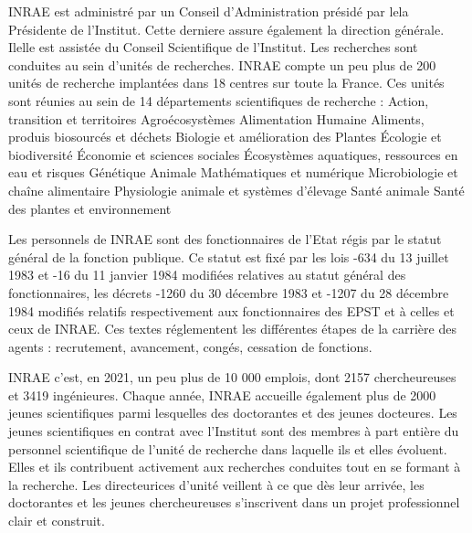 INRAE est administr\'e par un Conseil d'Administration pr\'esid\'e par le\mp la Pr\'esident\mp e de l'Institut. Ce\mp tte dernier\mp e assure \'egalement la direction g\'en\'erale. Il\mp elle est assist\'e\mp e du Conseil Scientifique de l'Institut. Les recherches sont conduites au sein d'unit\'es de recherches. INRAE compte un peu plus de 200 unit\'es de recherche implant\'ees dans 18 centres sur toute la France. Ces unit\'es sont r\'eunies au sein de 14 d\'epartements scientifiques de recherche :
\og Action, transition et territoires \fg{}
\og  Agro\'ecosyst\`emes \fg{}
\og  Alimentation Humaine \fg{}
\og  Aliments, produis biosourc\'es et d\'echets \fg{}
\og  Biologie et am\'elioration des Plantes \fg{}
\og  \'Ecologie et biodiversit\'e \fg{}
\og  \'Economie et sciences sociales \fg{}
\og  \'Ecosyst\`emes aquatiques, ressources en eau et risques \fg{}
\og  G\'en\'etique Animale \fg{}
\og  Math\'ematiques et num\'erique \fg{}
\og  Microbiologie et cha\^ine alimentaire \fg{}
\og  Physiologie animale et syst\`emes d'\'elevage \fg{}
\og  Sant\'e animale \fg{}
\og  Sant\'e des plantes et environnement \fg{}

Les personnels de INRAE sont des fonctionnaires de l'Etat r\'egis par le statut g\'en\'eral de la fonction publique. Ce statut est fix\'e par les lois -634 du 13 juillet 1983 et -16 du 11 janvier 1984 modifi\'ees relatives au statut g\'en\'eral des fonctionnaires, les d\'ecrets -1260 du 30 d\'ecembre 1983 et -1207 du 28 d\'ecembre 1984 modifi\'es relatifs respectivement aux fonctionnaires des EPST et \`a celles et ceux de INRAE. Ces textes r\'eglementent les diff\'erentes \'etapes de la carri\`ere des agents : recrutement, avancement, cong\'es, cessation de fonctions.

INRAE c'est, en 2021, un peu plus de 10 000 emplois, dont 2157 chercheur\mp euse\mp s et 3419 ing\'enieur\mp e\mp s. Chaque ann\'ee, INRAE accueille \'egalement plus de 2000 jeunes scientifiques parmi lesquel\mp le\mp s des doctorant\mp e\mp s et des jeunes docteur\mp e\mp s. Les jeunes scientifiques en contrat avec l'Institut sont des membres \`a part enti\`ere du personnel scientifique de l'unit\'e de recherche dans laquelle ils et elles \'evoluent. Elles et ils contribuent activement aux recherches conduites tout en se formant \`a la recherche. Les directeur\mp ices d'unit\'e veillent \`a ce que d\`es leur arriv\'ee, les doctorant\mp e\mp s et les jeunes chercheur\mp euse\mp s s'inscrivent dans un projet professionnel clair et construit.

